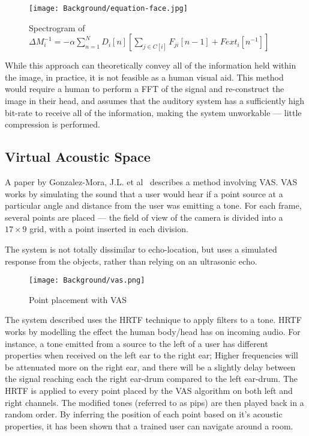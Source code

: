 \begin{figure}[H]
    \centering
    \texttt{[image: Background/equation-face.jpg]}
    \caption{Spectrogram of $\Delta M_i^{-1} = - \alpha \sum_{n=1}^N D_i \left[ n \right] \left[ \sum_{j \in C \left[ i \right]}^{} F_{ji} \left[ n -1 \right] + Fext_i \left[ n^{-1} \right] \right]$~\cite{aphex-equation}}
\end{figure}

While this approach can theoretically convey all of the information held within the image, in practice, it is not feasible as a human visual aid. This method would require a human to perform a \ac{FFT} of the signal and re-construct the image in their head, and assumes that the auditory system has a sufficiently high bit-rate to receive all of the information, making the system unworkable --- little compression is performed. 

\subsection{Virtual Acoustic Space}
\label{sec:vas}
A paper by Gonzalez-Mora, J.L. et al~\cite{vas} describes a method involving \ac{VAS}. \ac{VAS} works by simulating the sound that a user would hear if a point source at a particular angle and distance from the user was emitting a tone. For each frame, several points are placed --- the field of view of the camera is divided into a $17\times9$ grid, with a point inserted in each division. 

The system is not totally dissimilar to echo-location, but uses a simulated response from the objects, rather than relying on an ultrasonic echo.

\begin{figure}[H]
    \centering
    \texttt{[image: Background/vas.png]}
    \caption{Point placement with \ac{VAS}}
\end{figure}

The system described uses the \ac{HRTF} technique to apply filters to a tone. \ac{HRTF} works by modelling the effect the human body/head has on incoming audio. For instance, a tone emitted from a source to the left of a user has different properties when received on the left ear to the right ear; Higher frequencies will be attenuated more on the right ear, and there will be a slightly delay between the signal reaching each the right ear-drum compared to the left ear-drum. The \ac{HRTF} is applied to every point placed by the \ac{VAS} algorithm on both left and right channels. The modified tones (referred to as pips) are then played back in a random order. By inferring the position of each point based on it's acoustic properties, it has been shown that a trained user can navigate around a room.

